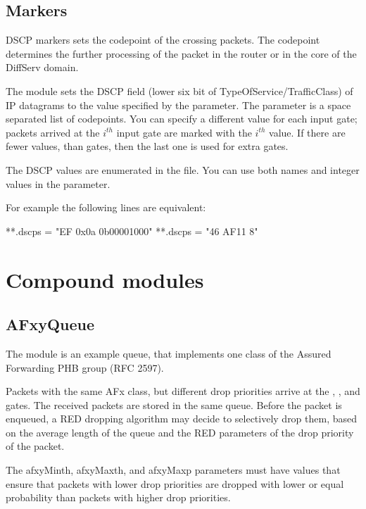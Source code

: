 \subsection{Markers}
\label{sec:diffserv:markers}

DSCP markers sets the codepoint of the crossing packets.
The codepoint determines the further processing of the packet
in the router or in the core of the DiffServ domain.

The  module sets the DSCP field
(lower six bit of TypeOfService/TrafficClass) of IP datagrams
to the value specified by the  parameter.
The  parameter is a space separated list
of codepoints. You can specify a different value
for each input gate; packets arrived at the $i^{th}$
input gate are marked with the $i^{th}$ value.
If there are fewer values, than gates, then the last
one is used for extra gates.

The DSCP values are enumerated in the  file.
You can use both names and integer values in the 
parameter.

For example the following lines are equivalent:
\begin{inifile}
**.dscps = "EF 0x0a 0b00001000"
**.dscps = "46 AF11 8"
\end{inifile}

\section{Compound modules}
\label{sec:diffserv:compound-modules}

\subsection{AFxyQueue}
\label{sec:diffserv:afxyqueue}

The  module is an example queue, that implements
one class of the Assured Forwarding PHB group (RFC 2597).

Packets with the same AFx class, but different drop priorities
arrive at the , , and  gates.
The received packets are stored in the same queue. Before the packet
is enqueued, a RED dropping algorithm may decide to selectively
drop them, based on the average length of the queue and the RED parameters
of the drop priority of the packet.

The afxyMinth, afxyMaxth, and afxyMaxp parameters must have values that
ensure that packets with lower drop priorities are dropped with lower
or equal probability than packets with higher drop priorities.

